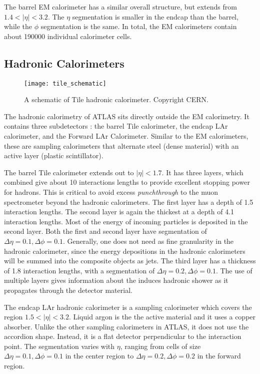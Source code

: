 The barrel EM calorimeter has a similar overall structure, but extends from $1.4 < |\eta| < 3.2$.
The $\eta$ segmentation is smaller in the endcap than the barrel, while the $\phi$ segmentation is the same.
In total, the EM calorimeters contain about 190000 individual calorimeter cells.


\subsection{Hadronic Calorimeters}
\begin{figure}[tbp]
\caption{A schematic of Tile hadronic calorimeter. Copyright CERN.} \label{fig:tile_schematic}
\texttt{[image: tile\_schematic]}
\end{figure}

The hadronic calorimetry of ATLAS sits directly outside the EM calorimetry.
It contains three subdetectors : the barrel Tile calorimeter, the endcap LAr calorimeter, and the Forward  LAr Calorimeter.
Similar to the EM calorimeters, these are sampling calorimeters that alternate steel (dense material) with an active layer (plastic scintillator).

The barrel Tile calorimeter extends out to $|\eta| < 1.7$.
It has three layers, which combined give about 10 interactions lengths to provide excellent stopping power for hadrons.
This is critical to avoid excess \textit{punchthrough} to the muon spectrometer beyond the hadronic calorimeters.
The first layer has a depth of 1.5 interaction lengths.
The second layer is again the thickest at a depth of 4.1 interaction lengths.
Most of the energy of incoming particles is deposited in the second layer.
Both the first and second layer have segmentation of $\Delta\eta = 0.1, \Delta\phi = 0.1$.
Generally, one does not need as fine granularity in the hadronic calorimeter, since the energy depositions in the hadronic calorimeters will be summed into the composite objects as jets.
The third layer has a thickness of 1.8 interaction lengths, with a segmentation of $\Delta\eta = 0.2, \Delta\phi = 0.1$.
The use of multiple layers gives information about the induces hadronic shower as it propagates through the detector material.

The endcap LAr hadronic calorimeter is a sampling calorimeter which covers the region $1.5 < |\eta| < 3.2$.
Liquid argon is the the active material and it uses a copper absorber.
Unlike the other sampling calorimeters in ATLAS, it does not use the accordion shape.
Instead, it is a flat detector perpendicular to the interaction point.
The segmentation varies with $\eta$, ranging from cells of size $\Delta\eta = 0.1, \Delta\phi = 0.1$ in the center region to $\Delta\eta = 0.2, \Delta\phi = 0.2$ in the forward region.

